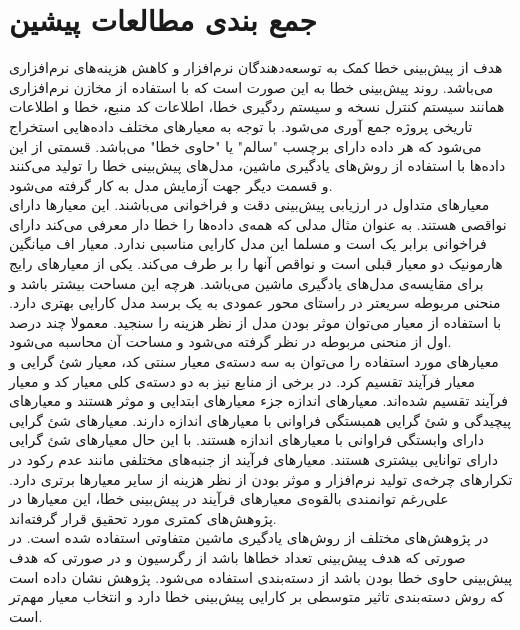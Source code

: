 \section{جمع بندی مطالعات پیشین}
هدف از پیش‌بینی خطا کمک به توسعه‌دهندگان نرم‌افزار و کاهش هزینه‌های نرم‌افزاری می‌باشد. روند پیش‌بینی خطا به این صورت است که با استفاده از مخازن نرم‌افزاری همانند سیستم کنترل نسخه و سیستم ردگیری خطا، اطلاعات کد منبع، خطا و اطلاعات تاریخی پروژه جمع آوری می‌شود. با توجه به معیارهای مختلف داده‌هایی استخراج می‌شود که هر داده دارای برچسب "سالم" یا "حاوی خطا" می‌باشد. قسمتی از این داده‌ها با استفاده از روش‌های یادگیری ماشین، مدل‌های پیش‌بینی خطا را تولید می‌کنند و قسمت دیگر جهت آزمایش مدل به کار گرفته می‌شود.\\

معیارهای متداول در ارزیابی پیش‌بینی دقت و فراخوانی می‌باشند. این معیارها دارای نواقصی هستند. به عنوان مثال مدلی که همه‌ی داده‌ها را خطا دار معرفی می‌کند دارای فراخوانی  برابر یک است و مسلما این مدل کارایی مناسبی ندارد. معیار اف  میانگین هارمونیک دو معیار قبلی است و نواقص آنها را بر طرف می‌کند. یکی از معیار‌های رایج برای مقایسه‌ی مدل‌های یادگیری ماشین  می‌باشد. هرچه این مساحت بیشتر باشد و منحنی مربوطه سریعتر  در راستای محور عمودی  به یک برسد مدل کارایی بهتری دارد. با استفاده از معیار  می‌توان موثر بودن مدل از نظر هزینه را سنجید. معمولا چند درصد اول از منحنی مربوطه در نظر گرفته می‌شود و مساحت آن محاسبه می‌شود. \\

معیارهای مورد استفاده را می‌توان به سه دسته‌ی معیار سنتی کد، معیار شئ گرایی و معیار فرآیند تقسیم کرد. در برخی از منابع نیز  به دو دسته‌ی کلی معیار کد و معیار فرآیند تقسیم شده‌اند. معیارهای اندازه جزء معیارهای ابتدایی و موثر هستند و معیارهای پیچیدگی و شئ گرایی همبستگی فراوانی با معیارهای اندازه دارند. معیارهای شئ گرایی دارای وابستگی فراوانی با معیار‌های اندازه هستند. با این حال معیارهای شئ گرایی دارای توانایی بیشتری هستند. معیارهای فرآیند از جنبه‌های مختلفی  مانند عدم رکود در تکرار‌های چرخه‌ی تولید نرم‌افزار و موثر بودن از نظر هزینه از سایر معیارها برتری دارد. علی‌رغم توانمندی بالقوه‌ی معیارهای فرآیند در پیش‌بینی خطا، این معیارها در پژوهش‌های کمتری مورد تحقیق قرار گرفته‌اند. \\

در پژوهش‌های مختلف از روش‌های یادگیری ماشین متفاوتی استفاده شده است. در صورتی که هدف پیش‌بینی تعداد خطاها باشد از رگرسیون و در صورتی که هدف پیش‌بینی حاوی خطا بودن باشد از دسته‌بندی استفاده می‌شود. پژوهش \cite{arisholm2010systematic}  نشان داده است که روش دسته‌بندی تاثیر متوسطی بر کارایی پیش‌بینی خطا دارد و انتخاب معیار مهم‌تر است. \\

